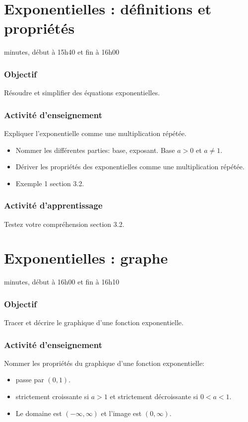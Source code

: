 \documentclass[12pt]{article}
\begin{document}
\clearpage
\section{Exponentielles : définitions et propriétés}
 minutes, début à 15h40 et fin à 16h00
\subsubsection*{\faBullseye{} Objectif}
Résoudre et simplifier des équations exponentielles.
\subsubsection*{\faChalkboardTeacher{} Activité d'enseignement}
Expliquer l'exponentielle comme une multiplication répétée.
\begin{itemize}
\item Nommer les différentes parties: base, exposant. Base $a > 0$ et $a \neq 1$.
\item Dériver les propriétés des exponentielles comme une multiplication répétée.
\item Exemple 1 section 3.2.
\end{itemize}

\subsubsection*{\faCalculator{} Activité d'apprentissage}
Testez votre compréhension section 3.2.


\clearpage
\section{Exponentielles : graphe}
 minutes, début à 16h00 et fin à 16h10
\subsubsection*{\faBullseye{} Objectif}
Tracer et décrire le graphique d'une fonction exponentielle.
\subsubsection*{\faChalkboardTeacher{} Activité d'enseignement}
Nommer les propriétés du graphique d'une fonction exponentielle: 
\begin{itemize}
\item passe par $(0,1)$.
\item strictement croissante si $a > 1$ et strictement décroissante si $0 < a < 1$.
\item Le domaine est $(-\infty, \infty)$ et l'image est $(0, \infty)$.
\end{itemize}
\end{document}
